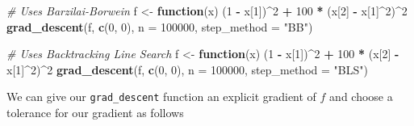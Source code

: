 \documentclass[12pt,]{article}
\newenvironment{Shaded}{\begin{snugshade}}{\end{snugshade}}
\newcommand{\CommentTok}[1]{\textcolor[rgb]{0.56,0.35,0.01}{\textit{#1}}}
\newcommand{\ControlFlowTok}[1]{\textcolor[rgb]{0.13,0.29,0.53}{\textbf{#1}}}
\newcommand{\DataTypeTok}[1]{\textcolor[rgb]{0.13,0.29,0.53}{#1}}
\newcommand{\DecValTok}[1]{\textcolor[rgb]{0.00,0.00,0.81}{#1}}
\newcommand{\KeywordTok}[1]{\textcolor[rgb]{0.13,0.29,0.53}{\textbf{#1}}}
\newcommand{\NormalTok}[1]{#1}
\newcommand{\OperatorTok}[1]{\textcolor[rgb]{0.81,0.36,0.00}{\textbf{#1}}}
\newcommand{\StringTok}[1]{\textcolor[rgb]{0.31,0.60,0.02}{#1}}
\begin{document}
\begin{Shaded}
\begin{Highlighting}[]
    \CommentTok{# Uses Barzilai-Borwein}
\NormalTok{    f <-}\StringTok{ }\ControlFlowTok{function}\NormalTok{(x) (}\DecValTok{1} \OperatorTok{-}\StringTok{ }\NormalTok{x[}\DecValTok{1}\NormalTok{])}\OperatorTok{^}\DecValTok{2} \OperatorTok{+}\StringTok{ }\DecValTok{100} \OperatorTok{*}\StringTok{ }\NormalTok{(x[}\DecValTok{2}\NormalTok{] }\OperatorTok{-}\StringTok{ }\NormalTok{x[}\DecValTok{1}\NormalTok{]}\OperatorTok{^}\DecValTok{2}\NormalTok{)}\OperatorTok{^}\DecValTok{2}
    \KeywordTok{grad_descent}\NormalTok{(f, }\KeywordTok{c}\NormalTok{(}\DecValTok{0}\NormalTok{, }\DecValTok{0}\NormalTok{), }\DataTypeTok{n =} \DecValTok{100000}\NormalTok{, }\DataTypeTok{step_method =} \StringTok{"BB"}\NormalTok{)}
\end{Highlighting}
\end{Shaded}

\begin{Shaded}
\begin{Highlighting}[]
    \CommentTok{# Uses Backtracking Line Search}
\NormalTok{    f <-}\StringTok{ }\ControlFlowTok{function}\NormalTok{(x) (}\DecValTok{1} \OperatorTok{-}\StringTok{ }\NormalTok{x[}\DecValTok{1}\NormalTok{])}\OperatorTok{^}\DecValTok{2} \OperatorTok{+}\StringTok{ }\DecValTok{100} \OperatorTok{*}\StringTok{ }\NormalTok{(x[}\DecValTok{2}\NormalTok{] }\OperatorTok{-}\StringTok{ }\NormalTok{x[}\DecValTok{1}\NormalTok{]}\OperatorTok{^}\DecValTok{2}\NormalTok{)}\OperatorTok{^}\DecValTok{2}
    \KeywordTok{grad_descent}\NormalTok{(f, }\KeywordTok{c}\NormalTok{(}\DecValTok{0}\NormalTok{, }\DecValTok{0}\NormalTok{), }\DataTypeTok{n =} \DecValTok{100000}\NormalTok{, }\DataTypeTok{step_method =} \StringTok{"BLS"}\NormalTok{)}
\end{Highlighting}
\end{Shaded}

We can give our \texttt{grad\_descent} function an explicit gradient of
\(f\) and choose a tolerance for our gradient as follows
\end{document}
